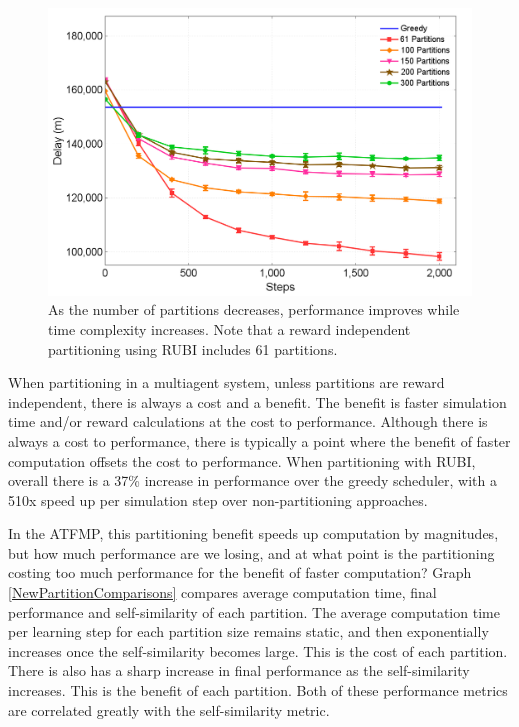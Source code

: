 \documentclass[onehalf,11pt]{beavtex}
\begin{document}
\begin{figure}
\centering
\includegraphics[width=1.0\columnwidth]{ATFMPNewvsGreedy}
\caption{As the number of partitions decreases, performance improves while time complexity increases. Note that a reward independent partitioning using RUBI includes 61 partitions. }
\label{ATFMPNewvsGreedy}
\end{figure}

When partitioning in a multiagent system, unless partitions are reward independent, there is always a cost and a benefit. The benefit is faster simulation time and/or reward calculations at the cost to performance. Although there is always a cost to performance, there is typically a point where the benefit of faster computation offsets the cost to performance. When partitioning with RUBI, overall there is a 37\% increase in performance over the greedy scheduler, with a 510x speed up per simulation step over non-partitioning approaches.

In the ATFMP, this partitioning benefit speeds up computation by magnitudes, but how much performance are we losing, and at what point is the partitioning costing too much performance for the benefit of faster computation? Graph \ref{NewPartitionComparisons} compares average computation time, final performance and self-similarity of each partition. The average computation time per learning step for each partition size remains static, and then exponentially increases once the self-similarity becomes large. This is the cost of each partition. There is also has a sharp increase in final performance as the self-similarity increases. This is the benefit of each partition. Both of these performance metrics are correlated greatly with the self-similarity metric.
\end{document}
